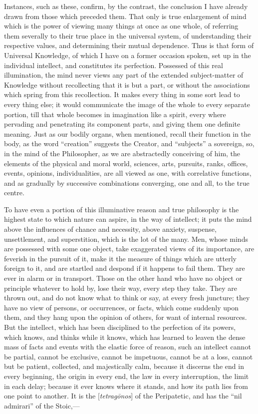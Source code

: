 Instances, such as these, confirm, by the contrast, the conclusion
I have already drawn from those which preceded them. That only is true
enlargement of mind which is the power of viewing many things at
once as one whole, of referring them severally to their true place in
the universal system, of understanding their respective values, and
determining their mutual dependence. Thus is that form of Universal
Knowledge, of which I have on a former occasion spoken, set up in the
individual intellect, and constitutes its perfection. Possessed of
this real illumination, the mind never views any part of the extended
subject-matter of Knowledge without recollecting that it is but a
part, or without the associations which spring from this recollection.
It makes every thing in some sort lead to every thing else; it would
communicate the image of the whole to every separate portion, till
that whole becomes in imagination like a spirit, every where pervading
and penetrating its component parts, and giving them one definite
meaning. Just as our bodily organs, when mentioned, recall their
function in the body, as the word ``creation'' suggests the
Creator, and ``subjects'' a sovereign, so, in the mind of the
Philosopher, as we are abstractedly conceiving of him, the elements of
the physical and moral world, sciences, arts, pursuits, ranks,
offices, events, opinions, individualities, are all viewed as one,
with correlative functions, and as gradually by successive
combinations converging, one and all, to the true centre.

To have even a portion of this illuminative reason and true
philosophy is the highest state to which nature can aspire, in the way
of intellect; it puts the mind above the influences of chance and
necessity, above anxiety, suspense, unsettlement, and superstition,
which is the lot of the many. Men, whose minds are possessed with some
one object, take exaggerated views of its importance, are feverish in
the pursuit of it, make it the measure of things which are utterly
foreign to it, and are startled and despond if it happens to
fail them. They are ever in alarm or in transport. Those on the other
hand who have no object or principle whatever to hold by, lose their
way, every step they take. They are thrown out, and do not know what
to think or say, at every fresh juncture; they have no view of
persons, or occurrences, or facts, which come suddenly upon them, and
they hang upon the opinion of others, for want of internal resources.
But the intellect, which has been disciplined to the perfection of its
powers, which knows, and thinks while it knows, which has learned to
leaven the dense mass of facts and events with the elastic force of
reason, such an intellect cannot be partial, cannot be exclusive,
cannot be impetuous, cannot be at a loss, cannot but be patient,
collected, and majestically calm, because it discerns the end in every
beginning, the origin in every end, the law in every interruption, the
limit in each delay; because it ever knows where it stands, and how
its path lies from one point to another. It is the [\emph{tetrag\={o}nos}]
of the Peripatetic, and has the ``nil admirari'' of the Stoic,—

